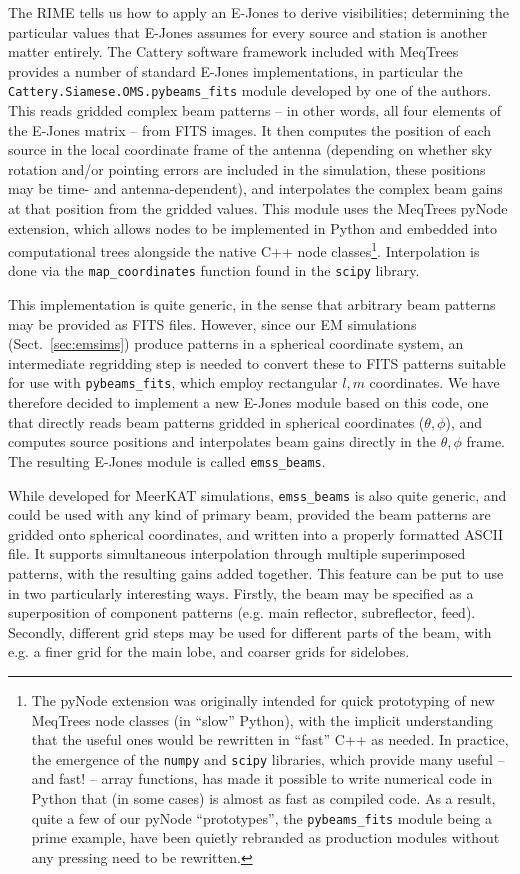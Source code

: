 \documentclass{aa}
\begin{document}
The RIME tells us how to apply an E-Jones to derive visibilities; determining the particular values that 
E-Jones assumes for every source and station is another matter entirely. The Cattery software framework included with MeqTrees provides a number of standard E-Jones implementations, in particular the
{\tt Cattery.Siamese.OMS.pybeams\_fits} module developed by one of the authors. This reads gridded complex beam patterns -- in other words, all four elements of the E-Jones matrix -- from FITS images. It then computes the position of each source in the local coordinate frame of the antenna (depending on whether sky rotation and/or pointing errors are included in the simulation, these positions may be time- and antenna-dependent), and interpolates the complex beam gains at that position from the gridded values. This module uses the MeqTrees pyNode extension, which allows nodes to be implemented in Python and embedded into computational trees alongside the native C++ node classes\footnote{The pyNode extension was originally intended for quick prototyping of new MeqTrees node classes (in ``slow'' Python), with the implicit understanding that the useful ones would be rewritten in ``fast'' C++ as needed. In practice, the emergence of the {\tt numpy} and {\tt scipy} libraries, which provide many useful -- and fast! -- array functions, has made it possible to write numerical code in Python that (in some cases) is almost as fast as compiled code. As a result, quite a few of our pyNode ``prototypes'', the {\tt pybeams\_fits} module being a prime example, have been quietly rebranded as production modules without any pressing need to be rewritten.}. Interpolation is done via the {\tt map\_coordinates} function found in the {\tt scipy} library. 

This implementation is quite generic, in the sense that arbitrary beam patterns may be provided as FITS files. However, since our EM simulations (Sect.~\ref{sec:emsims}) produce patterns in a spherical coordinate system, an intermediate regridding step is needed to convert these to FITS patterns suitable for use with {\tt pybeams\_fits}, which employ rectangular $l,m$ coordinates. We have therefore decided to implement a new E-Jones module based on this code, one that directly reads beam patterns gridded in spherical coordinates ($\theta,\phi$), and computes source positions and interpolates beam gains directly in the $\theta,\phi$ frame. The resulting E-Jones module is called {\tt emss\_beams}.

While developed for MeerKAT simulations, {\tt emss\_beams} is also quite generic, and could be used with any kind of primary beam, provided the beam patterns are gridded onto spherical coordinates, and written into a properly formatted ASCII file. It supports simultaneous interpolation through multiple superimposed patterns, with the resulting gains added together. This feature can be put to use in two particularly interesting ways. Firstly, the beam may be specified as a superposition of component patterns (e.g. main reflector, subreflector, feed). Secondly, different grid steps may be used for different parts of the beam, with e.g. a finer grid for the main lobe, and coarser grids for sidelobes. 
\end{document}
